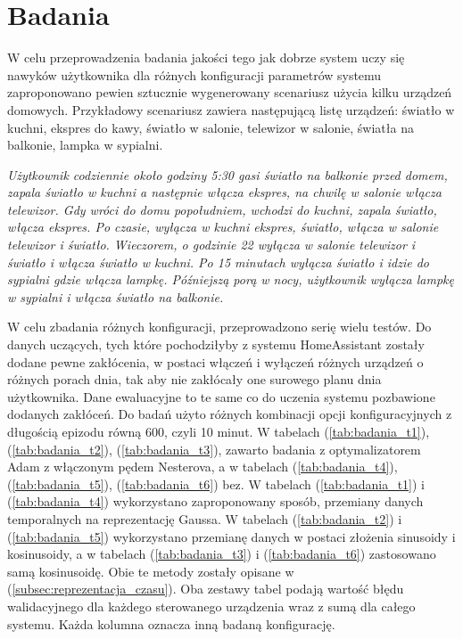 \chapter{Badania}

W celu przeprowadzenia badania jakości tego jak dobrze system uczy się nawyków użytkownika dla różnych konfiguracji parametrów systemu zaproponowano pewien sztucznie wygenerowany scenariusz użycia kilku urządzeń domowych. Przykładowy scenariusz zawiera następującą listę urządzeń: światło w kuchni, ekspres do kawy, światło w salonie, telewizor w salonie, światła na balkonie, lampka w sypialni.

\textit{Użytkownik codziennie około godziny 5:30 gasi światło na balkonie przed domem, zapala światło w kuchni a następnie włącza ekspres, na chwilę w salonie włącza telewizor. Gdy wróci do domu popołudniem, wchodzi do kuchni, zapala światło, włącza ekspres. Po czasie, wyłącza w kuchni ekspres, światło, włącza w salonie telewizor i światło. Wieczorem, o godzinie 22 wyłącza w salonie telewizor i światło i włącza światło w kuchni.
Po 15 minutach wyłącza światło i idzie do sypialni gdzie włącza lampkę. Późniejszą porą w nocy, użytkownik wyłącza lampkę w sypialni i włącza światło na balkonie.}

W celu zbadania różnych konfiguracji, przeprowadzono serię wielu testów. Do danych uczących, tych które pochodziłyby z systemu HomeAssistant zostały dodane pewne zakłócenia, w postaci włączeń i wyłączeń różnych urządzeń o różnych porach dnia, tak aby nie zakłócały one surowego planu dnia użytkownika. Dane ewaluacyjne to te same co do uczenia systemu pozbawione dodanych zakłóceń. Do badań użyto różnych kombinacji opcji konfiguracyjnych z długością epizodu równą 600, czyli 10 minut. W tabelach (\ref{tab:badania_t1}), (\ref{tab:badania_t2}), (\ref{tab:badania_t3}), zawarto badania z optymalizatorem Adam z włączonym pędem Nesterova, a w tabelach (\ref{tab:badania_t4}), (\ref{tab:badania_t5}), (\ref{tab:badania_t6}) bez. W tabelach (\ref{tab:badania_t1}) i (\ref{tab:badania_t4}) wykorzystano zaproponowany sposób, przemiany danych temporalnych na reprezentację Gaussa. W tabelach (\ref{tab:badania_t2}) i (\ref{tab:badania_t5}) wykorzystano przemianę danych w postaci złożenia sinusoidy i kosinusoidy, a w tabelach (\ref{tab:badania_t3}) i (\ref{tab:badania_t6}) zastosowano samą kosinusoidę. Obie te metody zostały opisane w (\ref{subsec:reprezentacja_czasu}). Oba zestawy tabel podają wartość błędu walidacyjnego dla każdego sterowanego urządzenia wraz z sumą dla całego systemu. Każda kolumna oznacza inną badaną konfigurację.

